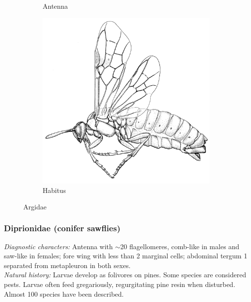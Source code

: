 \documentclass[letterpaper, 11pt]{article}
\begin{document}
\begin{figure}[ht!]
\begin{subfigure}[ht!]{0.11\textwidth}
        \caption{Antenna}
        \label{fig:argid1}
    \end{subfigure}
    \qquad
    \begin{subfigure}[ht!]{0.45\textwidth}
        \includegraphics[width=\textwidth]{ArgidHabitus}
        \caption{Habitus}
        \label{fig:argid2}
    \end{subfigure}
    \caption{Argidae \citep[][pg. 106 (a) and Fig. 26 (b)]{goulet1993hymenoptera}}\label{fig:argid}
\end{figure}

\subsubsection{Diprionidae (conifer sawflies)}
\noindent{}\textit{Diagnostic characters:} Antenna with $\sim$20 flagellomeres, comb-like in males and saw-like in females; fore wing with less than 2 marginal cells; abdominal tergum 1 separated from metapleuron in both sexes.\\

\noindent{}\textit{Natural history:} Larvae develop as folivores on pines. Some species are considered pests. Larvae often feed gregariously, regurgitating pine resin when disturbed. Almost 100 species have been described.\\
\end{document}
